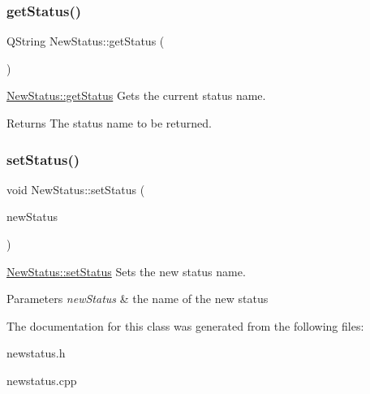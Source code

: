 \subsubsection{\texorpdfstring{get\+Status()}{getStatus()}}
{\footnotesize\ttfamily Q\+String New\+Status\+::get\+Status (\begin{DoxyParamCaption}{ }\end{DoxyParamCaption})}



\mbox{\hyperlink{class_new_status_a7ea744ad1645c5954000983d50947154}{New\+Status\+::get\+Status}} Gets the current status name. 

\begin{DoxyReturn}{Returns}
The status name to be returned. 
\end{DoxyReturn}
\mbox{\label{class_new_status_a861326c3b5c45040b933e4e65a4646e2}} 
\subsubsection{\texorpdfstring{set\+Status()}{setStatus()}}
{\footnotesize\ttfamily void New\+Status\+::set\+Status (\begin{DoxyParamCaption}\item[{Q\+String}]{new\+Status }\end{DoxyParamCaption})}



\mbox{\hyperlink{class_new_status_a861326c3b5c45040b933e4e65a4646e2}{New\+Status\+::set\+Status}} Sets the new status name. 


\begin{DoxyParams}{Parameters}
{\em new\+Status} & the name of the new status \\
\hline
\end{DoxyParams}


The documentation for this class was generated from the following files\+:\begin{DoxyCompactItemize}
\item 
newstatus.\+h\item 
newstatus.\+cpp\end{DoxyCompactItemize}
